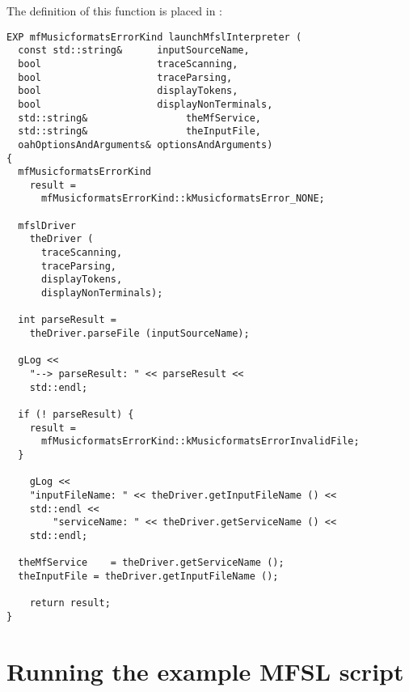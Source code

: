 The definition of this function is placed in :
\begin{lstlisting}[language=Terminal]
EXP mfMusicformatsErrorKind launchMfslInterpreter (
  const std::string&      inputSourceName,
  bool                    traceScanning,
  bool                    traceParsing,
  bool                    displayTokens,
  bool                    displayNonTerminals,
  std::string&                 theMfService,
  std::string&                 theInputFile,
  oahOptionsAndArguments& optionsAndArguments)
{
  mfMusicformatsErrorKind
    result =
      mfMusicformatsErrorKind::kMusicformatsError_NONE;

  mfslDriver
    theDriver (
      traceScanning,
      traceParsing,
      displayTokens,
      displayNonTerminals);

  int parseResult =
  	theDriver.parseFile (inputSourceName);

  gLog <<
    "--> parseResult: " << parseResult <<
    std::endl;

  if (! parseResult) {
    result =
      mfMusicformatsErrorKind::kMusicformatsErrorInvalidFile;
  }

	gLog <<
    "inputFileName: " << theDriver.getInputFileName () <<
  	std::endl <<
		"serviceName: " << theDriver.getServiceName () <<
  	std::endl;

  theMfService    = theDriver.getServiceName ();
  theInputFile = theDriver.getInputFileName ();

	return result;
}
\end{lstlisting}


\section{Running the example MFSL script}

